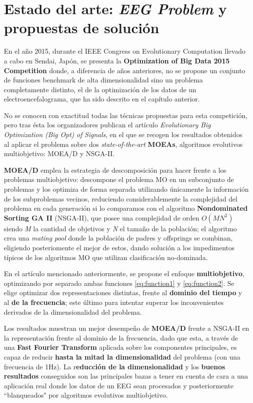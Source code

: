 \section{Estado del arte: \textit{EEG Problem} y propuestas de solución}

En el año 2015, durante el IEEE Congress on Evolutionary Computation llevado a cabo en Sendai, Japón\cite{IEEE-CEC2015}, se presenta la  \textbf{Optimization of Big Data 2015 Competition}\cite{CompetitionBigOpt} donde, a diferencia de años anteriores, no se propone un conjunto de funciones benchmark de alta dimensionalidad sino un problema completamente distinto, el de la optimización de los datos de un electroencefalograma, que ha sido descrito en el capítulo anterior.

No se conocen con exactitud todas las técnicas propuestas para esta competición, pero tras ésta los organizadores publican el artículo \textit{Evolutionary Big Optimization (Big Opt) of Signals}\cite{EvolutionaryBigOpt}, en el que se recogen los resultados obtenidos al aplicar el problema sobre dos \textit{state-of-the-art} \textbf{MOEAs}, algoritmos evolutivos multiobjetivo: MOEA/D y NSGA-II.

\textbf{MOEA/D}\cite{MOEA/D} emplea la estrategia de descomposición para hacer frente a los problemas multiobjetivo: descompone el problema MO en un subconjunto de problemas y los optimiza de forma separada utilizando únicamente la información de los subproblemas vecinos, reduciendo considerablemente la complejidad del problema en cada generación si lo comparamos con el algoritmo \textbf{Nondominated Sorting GA II} (NSGA-II)\cite{NSGA-II}, que posee una complejidad de orden $O(MN^2)$ siendo \textit{M} la cantidad de objetivos y \textit{N} el tamaño de la población; el algoritmo crea una \textit{mating pool} donde la población de padres y offsprings se combinan, eligiendo posteriomente el mejor de estos, dando solución a los impedimentos típicos de los algoritmos MO que utilizan clasificación no-dominada.

En el artículo mencionado anteriormente, se propone el enfoque \textbf{multiobjetivo}, optimizando por separado ambas funciones \ref{eq:function1} y \ref{eq:function2}. Se elige optimizar dos representaciones distintas, frente al \textbf{dominio del tiempo} y al \textbf{de la frecuencia}; este último para intentar superar los inconvenientes derivados de la dimensionalidad del problema.

Los resultados muestran un mejor desempeño de \textbf{MOEA/D} frente a NSGA-II en la representación frente al dominio de la frecuencia, dado que esta, a través de una \textbf{Fast Fourier Transform} aplicada sobre los componentes principales, es capaz de reducir \textbf{hasta la mitad la dimensionalidad} del problema (con una frecuencia de 1Hz). La r\textbf{educción de la dimensionalidad} y los\textbf{ buenos resultados} conseguidos son las principales bazas a tener en cuenta de cara a una aplicación real donde los datos de un EEG sean procesados y posteriormente ``blanqueados" por algoritmos evolutivos multiobjetivo.

